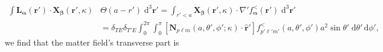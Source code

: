 \documentclass{article}
\begin{document}
\begin{equation}
\begin{split}
\int\mathbf{L}_{\bm{\alpha}}(\mathbf{r}')\cdot\mathbf{X}_{\bm{\beta}}(\mathbf{r}',\kappa)&\Theta(a - r')\;\mathrm{d}^3\mathbf{r}' = \int_{r' < a}\mathbf{X}_{\bm{\beta}}(\mathbf{r}',\kappa)\cdot\nabla' f_{\bm{\alpha}}^<(\mathbf{r}')\;\mathrm{d}^3\mathbf{r}'\\
&= \delta_{TE}\delta_{T'E}\int_0^{2\pi}\int_0^\pi\left[\mathbf{N}_{p\ell m}(a,\theta',\phi';\kappa)\cdot\hat{\mathbf{r}}'\right]f_{p'\ell' m'}^<(a,\theta',\phi')a^2\sin\theta'\;\mathrm{d}\theta'\,\mathrm{d}\phi',
\end{split}
\end{equation}
we find that the matter field's transverse part is
\end{document}
